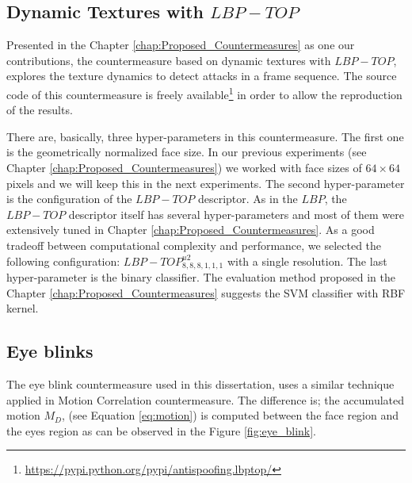 \subsection{Dynamic Textures with $LBP-TOP$}

Presented in the Chapter \ref{chap:Proposed_Countermeasures} as one our contributions, the countermeasure based on dynamic textures with $LBP-TOP$, explores the texture dynamics to detect attacks in a frame sequence. The source code of this countermeasure is freely available\footnote{\url{https://pypi.python.org/pypi/antispoofing.lbptop/}} in order to allow the reproduction of the results.

There are, basically, three hyper-parameters in this countermeasure. The first one is the geometrically normalized face size. In our previous experiments (see Chapter \ref{chap:Proposed_Countermeasures}) we worked with face sizes of $64 \times 64$ pixels and we will keep this in the next experiments. The second hyper-parameter is the configuration of the $LBP-TOP$ descriptor. As in the $LBP$, the $LBP-TOP$ descriptor itself has several hyper-parameters and most of them were extensively tuned in Chapter \ref{chap:Proposed_Countermeasures}. As a good tradeoff between computational complexity and performance, we selected the following configuration: $LBP-TOP^{u2}_{8,8,8,1,1,1}$ with a single resolution. The last hyper-parameter is the binary classifier. The evaluation method proposed in the Chapter \ref{chap:Proposed_Countermeasures} suggests the SVM classifier with RBF kernel.


\subsection{Eye blinks}

The eye blink countermeasure used in this dissertation, uses a similar technique applied in Motion Correlation countermeasure\cite{AnjosIJCB2011}. The difference is; the accumulated motion $M_D$, (see Equation \ref{eq:motion}) is computed between the face region and the eyes region as can be observed in the Figure \ref{fig:eye_blink}. 

